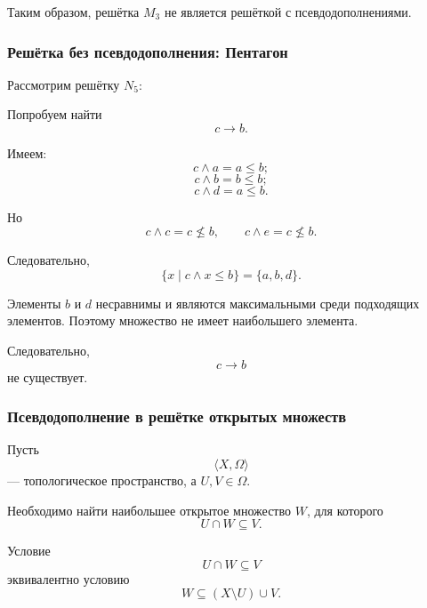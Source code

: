 \documentclass[12pt,a4paper,oneside,openany]{book}
\theoremstyle{definition}
\theoremstyle{plain}
\theoremstyle{remark}
\begin{document}
Таким образом, решётка \(M_3\) не является решёткой с
псевдодополнениями.

\subsubsection{Решётка без псевдодополнения: Пентагон}

Рассмотрим решётку \(N_5\):

\begin{center}
\end{center}

Попробуем найти
\[
c\to b.
\]

Имеем:
\[
c\wedge a=a\leq b;
\]
\[
c\wedge b=b\leq b;
\]
\[
c\wedge d=a\leq b.
\]

Но
\[
c\wedge c=c\nleq b,
\qquad
c\wedge e=c\nleq b.
\]

Следовательно,
\[
\{x\mid c\wedge x\leq b\}
=
\{a,b,d\}.
\]

Элементы \(b\) и \(d\) несравнимы и являются максимальными среди
подходящих элементов. Поэтому множество не имеет наибольшего
элемента.

Следовательно,
\[
c\to b
\]
не существует.

\subsubsection{Псевдодополнение в решётке открытых множеств}

Пусть
\[
\langle X,\Omega\rangle
\]
--- топологическое пространство, а \(U,V\in\Omega\).

Необходимо найти наибольшее открытое множество \(W\), для которого
\[
U\cap W\subseteq V.
\]

Условие
\[
U\cap W\subseteq V
\]
эквивалентно условию
\[
W\subseteq(X\setminus U)\cup V.
\]
\end{document}
